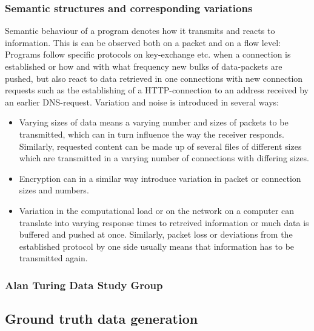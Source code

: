 \documentclass[a4paper,12pt,twoside]{report}
\begin{document}
\subsubsection{Semantic structures and corresponding variations}

Semantic behaviour of a program denotes how it transmits and reacts to information. This is can be observed both on a packet and on a flow level: Programs follow specific protocols on key-exchange etc. when a connection is established or how and with what frequency new bulks of data-packets are pushed, but also react to data retrieved in one connections with new connection requests such as the establishing of a HTTP-connection to an address received by an earlier DNS-request. Variation and noise is introduced in several ways:

\begin{itemize}

\item Varying sizes of data means a varying number and sizes of packets to be transmitted, which can in turn influence the way the receiver responds. Similarly, requested content can be made up of several files of different sizes which are transmitted in a varying number of connections with differing sizes.
\item Encryption can in a similar way introduce variation in packet or connection sizes and numbers.
\item Variation in the computational load or on the network on a computer can translate into varying response times to retreived information or much data is buffered and pushed at once. Similarly, packet loss or deviations from the established protocol by one side usually means that information has to be transmitted again.

\end{itemize}



\subsubsection{Alan Turing Data Study Group}



\subsection{Ground truth data generation}\label{Groundtruth}
\end{document}
